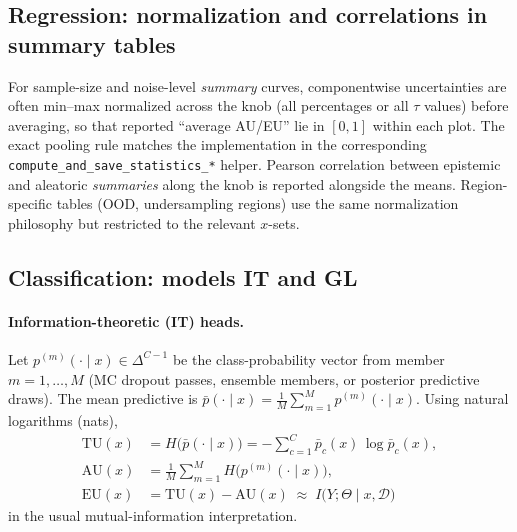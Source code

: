 \subsection{Regression: normalization and correlations in summary tables}
\label{sec:reg-norm}

For sample-size and noise-level \emph{summary} curves, componentwise uncertainties are often min--max normalized across the knob (all percentages or all $\tau$ values) before averaging, so that reported ``average AU/EU'' lie in $[0,1]$ within each plot. The exact pooling rule matches the implementation in the corresponding \texttt{compute\_and\_save\_statistics\_*} helper. Pearson correlation between epistemic and aleatoric \emph{summaries} along the knob is reported alongside the means. Region-specific tables (OOD, undersampling regions) use the same normalization philosophy but restricted to the relevant $x$-sets.

\subsection{Classification: models IT and GL}
\label{sec:clf-models}

\paragraph{Information-theoretic (IT) heads.}
Let $p^{(m)}(\cdot\mid x)\in\Delta^{C-1}$ be the class-probability vector from member $m=1,\ldots,M$ (MC dropout passes, ensemble members, or posterior predictive draws). The mean predictive is $\bar p(\cdot\mid x)=\frac{1}{M}\sum_{m=1}^M p^{(m)}(\cdot\mid x)$. Using natural logarithms (nats),
\begin{align}
  \mathrm{TU}(x) &= H\bigl(\bar p(\cdot\mid x)\bigr)
  = -\sum_{c=1}^C \bar p_c(x)\,\log \bar p_c(x), \\
  \mathrm{AU}(x) &= \frac{1}{M}\sum_{m=1}^M H\bigl(p^{(m)}(\cdot\mid x)\bigr), \\
  \mathrm{EU}(x) &= \mathrm{TU}(x)-\mathrm{AU}(x)
  \;\approx\; I\bigl(Y;\Theta\mid x,\mathcal{D}\bigr)
\end{align}
in the usual mutual-information interpretation.

